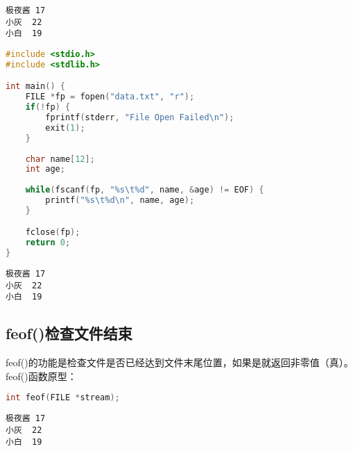 
\begin{lstlisting}[title=data.txt]
极夜酱	17
小灰	22
小白	19
\end{lstlisting}

\begin{lstlisting}[language=C, title=fscanf.c]
#include <stdio.h>
#include <stdlib.h>

int main() {
    FILE *fp = fopen("data.txt", "r");
    if(!fp) {
        fprintf(stderr, "File Open Failed\n");
        exit(1);
    }
    
    char name[12];
    int age;
    
    while(fscanf(fp, "%s\t%d", name, &age) != EOF) {
        printf("%s\t%d\n", name, age);
    }

    fclose(fp);
    return 0;
}
\end{lstlisting}

\begin{tcolorbox}
    \begin{verbatim}
极夜酱	17
小灰	22
小白	19
	\end{verbatim}
\end{tcolorbox}

\vspace{0.5cm}

\subsection{feof()检查文件结束}

feof()的功能是检查文件是否已经达到文件末尾位置，如果是就返回非零值（真）。\\

feof()函数原型：

\vspace{-0.5cm}

\begin{lstlisting}[language=C]
int feof(FILE *stream);
\end{lstlisting}

\vspace{0.5cm}


\begin{lstlisting}[title=data.txt]
极夜酱	17
小灰	22
小白	19
\end{lstlisting}

